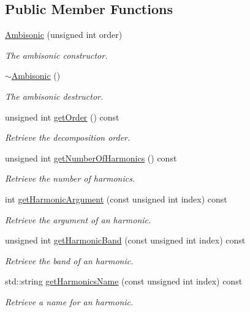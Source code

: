 \subsection*{Public Member Functions}
\begin{DoxyCompactItemize}
\item 
\hyperlink{class_hoa3_d_1_1_ambisonic_a43f91832422c0b59f92f02978dc1e541}{Ambisonic} (unsigned int order)
\begin{DoxyCompactList}\small\item\em The ambisonic constructor. \end{DoxyCompactList}\item 
\hyperlink{class_hoa3_d_1_1_ambisonic_a082fc2e3f9910703ddb49b9a478329bf}{$\sim$\-Ambisonic} ()
\begin{DoxyCompactList}\small\item\em The ambisonic destructor. \end{DoxyCompactList}\item 
unsigned int \hyperlink{class_hoa3_d_1_1_ambisonic_aaafb73b542206ce591378637f1fc49f9}{get\-Order} () const 
\begin{DoxyCompactList}\small\item\em Retrieve the decomposition order. \end{DoxyCompactList}\item 
unsigned int \hyperlink{class_hoa3_d_1_1_ambisonic_a837c44e3fc4504e6745b78c9cdf632bc}{get\-Number\-Of\-Harmonics} () const 
\begin{DoxyCompactList}\small\item\em Retrieve the number of harmonics. \end{DoxyCompactList}\item 
int \hyperlink{class_hoa3_d_1_1_ambisonic_a41f5fab14484b42a97175c2ea279c0ab}{get\-Harmonic\-Argument} (const unsigned int index) const 
\begin{DoxyCompactList}\small\item\em Retrieve the argument of an harmonic. \end{DoxyCompactList}\item 
unsigned int \hyperlink{class_hoa3_d_1_1_ambisonic_aa7db0765bbc3957771de1771f8617631}{get\-Harmonic\-Band} (const unsigned int index) const 
\begin{DoxyCompactList}\small\item\em Retrieve the band of an harmonic. \end{DoxyCompactList}\item 
std\-::string \hyperlink{class_hoa3_d_1_1_ambisonic_a9922a21205409c6de04497d03a317ada}{get\-Harmonics\-Name} (const unsigned int index) const 
\begin{DoxyCompactList}\small\item\em Retrieve a name for an harmonic. \end{DoxyCompactList}\end{DoxyCompactItemize}



